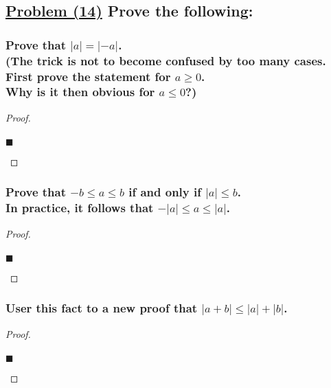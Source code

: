 \documentclass[letterpaper, 10 pt, conference]{ieeeconf}  %
\begin{document}
\subsection{\textbf{\underline{Problem (14)} Prove the following:}}

\subsubsection{\textbf{Prove that $\left\lvert a \right\rvert = \left\lvert -a \right\rvert$. \\ (The trick is not to become confused by too many cases. \\First prove the statement for $a \geq 0$. \\ Why is it then obvious for $a \leq 0$?)}}
\begin{proof}
\begin{align}
    
\end{align}
\begin{flushright}
$\blacksquare$
\end{flushright}
\end{proof}

\subsubsection{\textbf{Prove that $-b \leq a \leq b$ if and only if $\left\lvert a \right\lvert \leq b$. \\ In practice, it follows that $-\left\lvert a \right\lvert \leq a \leq \left\lvert a \right\lvert$.}}
\begin{proof}
\begin{align}
    
\end{align}
\begin{flushright}
$\blacksquare$
\end{flushright}
\end{proof}


\subsubsection{\textbf{User this fact to a new proof that $\left\lvert a + b \right\lvert \leq \left\lvert a \right\lvert + \left\lvert b \right\lvert$.}}
\begin{proof}
\begin{align}
    
\end{align}
\begin{flushright}
$\blacksquare$
\end{flushright}
\end{proof}
\end{document}
